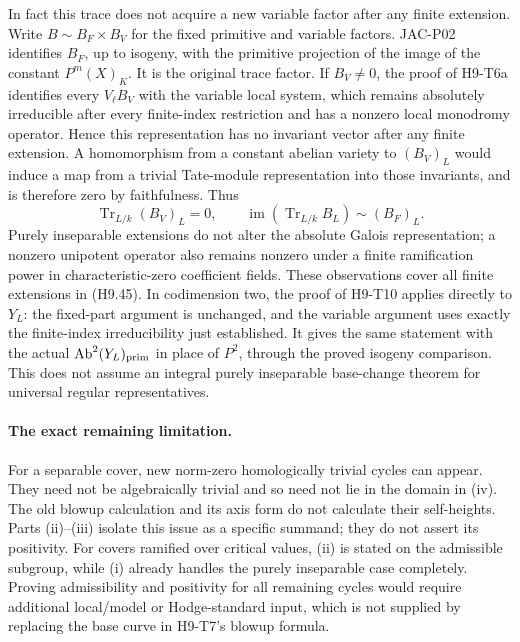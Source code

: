 \documentclass[11pt,a4paper]{article}
\begin{document}
In fact this trace does not acquire a new variable factor after any
finite extension. Write $B\sim B_F\times B_V$ for the fixed primitive
and variable factors. JAC-P02 identifies $B_F$, up to isogeny, with
the primitive projection of the image of the constant
$P^m(X)_K$. It is the original trace factor. If $B_V\ne0$, the proof
of H9-T6a identifies every $V_\ell B_V$ with the variable local system,
which remains absolutely irreducible after every finite-index
restriction and has a nonzero local monodromy operator. Hence this
representation has no invariant vector after any finite extension.
A homomorphism from a constant abelian variety to $(B_V)_L$ would
induce a map from a trivial Tate-module representation into those
invariants, and is therefore zero by faithfulness. Thus
\[
 \operatorname{Tr}_{L/k}(B_V)_L=0,
 \qquad
 \operatorname{im}(\operatorname{Tr}_{L/k}B_L)
        \sim (B_F)_L.                                      \tag{H9.45}
\]
Purely inseparable extensions do not alter the absolute Galois
representation; a nonzero unipotent operator also remains nonzero
under a finite ramification power in characteristic-zero coefficient
fields. These observations cover all finite extensions in (H9.45).
In codimension two, the proof of H9-T10 applies directly to $Y_L$:
the fixed-part argument is unchanged, and the variable argument uses
exactly the finite-index irreducibility just established. It gives the
same statement with the actual
$\operatorname{Ab}^2(Y_L)_{\rm prim}$ in place of $P^2$, through the
proved isogeny comparison. This does not assume an integral purely
inseparable base-change theorem for universal regular representatives.

\paragraph{The exact remaining limitation.}
For a separable cover, new norm-zero homologically trivial cycles can
appear. They need not be algebraically trivial and so need not lie in
the domain in (iv). The old blowup calculation and its axis form do not
calculate their self-heights. Parts (ii)--(iii) isolate this issue as a
specific summand; they do not assert its positivity. For covers ramified
over critical values, (ii) is stated on the admissible subgroup, while
(i) already handles the purely inseparable case completely. Proving
admissibility and positivity for all remaining cycles would require
additional local/model or Hodge-standard input, which is not supplied
by replacing the base curve in H9-T7's blowup formula.
\end{document}
